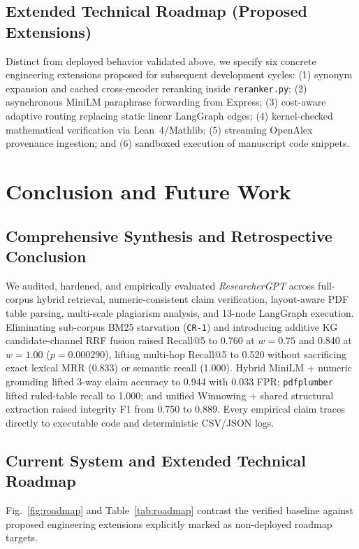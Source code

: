 \documentclass[conference]{IEEEtran}
\begin{document}
\subsection{Extended Technical Roadmap (Proposed Extensions)}
Distinct from deployed behavior validated above, we specify six concrete engineering extensions proposed for subsequent development cycles: (1) synonym expansion and cached cross-encoder reranking inside \texttt{reranker.py}; (2) asynchronous MiniLM paraphrase forwarding from Express; (3) cost-aware adaptive routing replacing static linear LangGraph edges; (4) kernel-checked mathematical verification via Lean~4/Mathlib; (5) streaming OpenAlex provenance ingestion; and (6) sandboxed execution of manuscript code snippets.

\section{Conclusion and Future Work}

\subsection{Comprehensive Synthesis and Retrospective Conclusion}
We audited, hardened, and empirically evaluated \emph{ResearcherGPT} across full-corpus hybrid retrieval, numeric-consistent claim verification, layout-aware PDF table parsing, multi-scale plagiarism analysis, and 13-node LangGraph execution. Eliminating sub-corpus BM25 starvation (\texttt{CR-1}) and introducing additive KG candidate-channel RRF fusion raised Recall@5 to 0.760 at $w{=}0.75$ and 0.840 at $w{=}1.00$ ($p{=}0.000290$), lifting multi-hop Recall@5 to 0.520 without sacrificing exact lexical MRR (0.833) or semantic recall (1.000). Hybrid MiniLM + numeric grounding lifted 3-way claim accuracy to 0.944 with 0.033 FPR; \texttt{pdfplumber} lifted ruled-table recall to 1.000; and unified Winnowing + shared structural extraction raised integrity F1 from 0.750 to 0.889. Every empirical claim traces directly to executable code and deterministic CSV/JSON logs.

\subsection{Current System and Extended Technical Roadmap}
Fig.~\ref{fig:roadmap} and Table~\ref{tab:roadmap} contrast the verified baseline against proposed engineering extensions explicitly marked as non-deployed roadmap targets.
\end{document}
